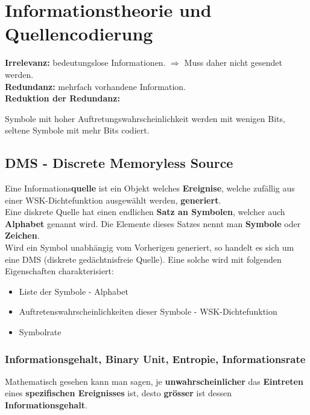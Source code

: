 \section{Informationstheorie und Quellencodierung }
\textbf{Irrelevanz:} bedeutungslose Informationen. $\Rightarrow$ Muss daher nicht gesendet werden. \\
\textbf{Redundanz:} mehrfach vorhandene Information. \\
\textbf{Reduktion der Redundanz:} \parbox[t]{14cm}{Symbole mit hoher Auftretungswahrscheinlichkeit werden mit wenigen Bits, seltene Symbole mit mehr Bits codiert.}
\subsection{DMS - Discrete Memoryless Source}
Eine Informations\textbf{quelle} ist ein Objekt welches \textbf{Ereignise}, welche zufällig aus einer
WSK-Dichtefunktion ausgewählt werden, \textbf{generiert}. \\ 
Eine diskrete Quelle hat einen endlichen \textbf{Satz an Symbolen}, welcher auch \textbf{Alphabet}
genannt wird. Die Elemente dieses Satzes nennt man \textbf{Symbole} oder \textbf{Zeichen}. \\
Wird ein Symbol unabhängig vom Vorherigen generiert, so handelt es sich um eine DMS (diskrete
gedächtnisfreie Quelle). Eine solche wird mit folgenden Eigenschaften charakterisiert:
\begin{itemize}\addtolength{\itemsep}{-0.3\baselineskip}
  \item Liste der Symbole - Alphabet
  \item Auftretenswahrscheinlichkeiten dieser Symbole - WSK-Dichtefunktion
  \item Symbolrate 
\end{itemize} 

\subsubsection{Informationsgehalt, Binary Unit, Entropie, Informationsrate }
Mathematisch gesehen kann man sagen, je \textbf{unwahrscheinlicher} das \textbf{Eintreten} eines \textbf{spezifischen
Ereignisses} ist, desto \textbf{grösser} ist dessen \textbf{Informationsgehalt}.

